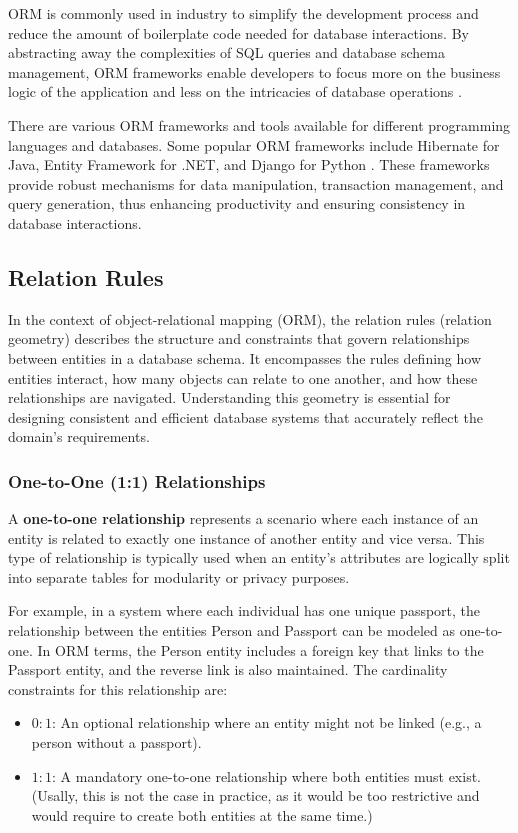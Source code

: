 

ORM is commonly used in industry to simplify the development process and reduce the amount of boilerplate code needed for database interactions. By abstracting away the complexities of SQL queries and database schema management, ORM frameworks enable developers to focus more on the business logic of the application and less on the intricacies of database operations \cite{larman2004applying}.


There are various ORM frameworks and tools available for different programming languages and databases. Some popular ORM frameworks include Hibernate for Java, Entity Framework for .NET, and Django for Python \cite{bernstein2009object}. These frameworks provide robust mechanisms for data manipulation, transaction management, and query generation, thus enhancing productivity and ensuring consistency in database interactions.

\subsection{Relation Rules} \label{sec:relation_rules}

In the context of object-relational mapping (ORM), the relation rules (relation geometry) describes the structure and constraints that govern relationships between entities in a database schema. It encompasses the rules defining how entities interact, how many objects can relate to one another, and how these relationships are navigated. Understanding this geometry is essential for designing consistent and efficient database systems that accurately reflect the domain's requirements.

\subsubsection{One-to-One (1:1) Relationships}
 A \textbf{one-to-one relationship} represents a scenario where each instance of an entity is related to exactly one instance of another entity and vice versa. This type of relationship is typically used when an entity's attributes are logically split into separate tables for modularity or privacy purposes.

For example, in a system where each individual has one unique passport, the relationship between the entities {Person} and {Passport} can be modeled as one-to-one. In ORM terms, the {Person} entity includes a foreign key that links to the {Passport} entity, and the reverse link is also maintained.
%
The cardinality constraints for this relationship are:
\begin{itemize}
    \item \(0:1\): An optional relationship where an entity might not be linked (e.g., a person without a passport).
    \item \(1:1\): A mandatory one-to-one relationship where both entities must exist. (Usally, this is not the case in practice, as it would be too restrictive and would require to create both entities at the same time.)
\end{itemize}

